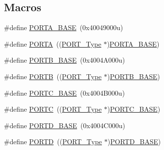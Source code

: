 \subsection*{Macros}
\begin{DoxyCompactItemize}
\item 
\#define \mbox{\hyperlink{group___p_o_r_t___peripheral___access___layer_gae3d20f730f9619aabbf94e2efd1de34c}{P\+O\+R\+T\+A\+\_\+\+B\+A\+SE}}~(0x40049000u)
\item 
\#define \mbox{\hyperlink{group___p_o_r_t___peripheral___access___layer_ga7c8a7f98a98d8cb125dd57a66720ab30}{P\+O\+R\+TA}}~((\mbox{\hyperlink{struct_p_o_r_t___type}{P\+O\+R\+T\+\_\+\+Type}} $\ast$)\mbox{\hyperlink{group___p_o_r_t___peripheral___access___layer_gae3d20f730f9619aabbf94e2efd1de34c}{P\+O\+R\+T\+A\+\_\+\+B\+A\+SE}})
\item 
\#define \mbox{\hyperlink{group___p_o_r_t___peripheral___access___layer_ga2a668049a5e6c09cf6a7164ffca38a7e}{P\+O\+R\+T\+B\+\_\+\+B\+A\+SE}}~(0x4004\+A000u)
\item 
\#define \mbox{\hyperlink{group___p_o_r_t___peripheral___access___layer_ga09a0c85cd3da09d9cdf63a5ac4c39f77}{P\+O\+R\+TB}}~((\mbox{\hyperlink{struct_p_o_r_t___type}{P\+O\+R\+T\+\_\+\+Type}} $\ast$)\mbox{\hyperlink{group___p_o_r_t___peripheral___access___layer_ga2a668049a5e6c09cf6a7164ffca38a7e}{P\+O\+R\+T\+B\+\_\+\+B\+A\+SE}})
\item 
\#define \mbox{\hyperlink{group___p_o_r_t___peripheral___access___layer_ga0018f0edf7f8030868f9cc791275378d}{P\+O\+R\+T\+C\+\_\+\+B\+A\+SE}}~(0x4004\+B000u)
\item 
\#define \mbox{\hyperlink{group___p_o_r_t___peripheral___access___layer_ga68fea88642279a70246e026e7221b0a5}{P\+O\+R\+TC}}~((\mbox{\hyperlink{struct_p_o_r_t___type}{P\+O\+R\+T\+\_\+\+Type}} $\ast$)\mbox{\hyperlink{group___p_o_r_t___peripheral___access___layer_ga0018f0edf7f8030868f9cc791275378d}{P\+O\+R\+T\+C\+\_\+\+B\+A\+SE}})
\item 
\#define \mbox{\hyperlink{group___p_o_r_t___peripheral___access___layer_gab88c980d0129f396683260eb978daf15}{P\+O\+R\+T\+D\+\_\+\+B\+A\+SE}}~(0x4004\+C000u)
\item 
\#define \mbox{\hyperlink{group___p_o_r_t___peripheral___access___layer_ga3e6a2517db4f9cb7c9037adf0aefe79b}{P\+O\+R\+TD}}~((\mbox{\hyperlink{struct_p_o_r_t___type}{P\+O\+R\+T\+\_\+\+Type}} $\ast$)\mbox{\hyperlink{group___p_o_r_t___peripheral___access___layer_gab88c980d0129f396683260eb978daf15}{P\+O\+R\+T\+D\+\_\+\+B\+A\+SE}})
\item 

\end{DoxyCompactItemize}
